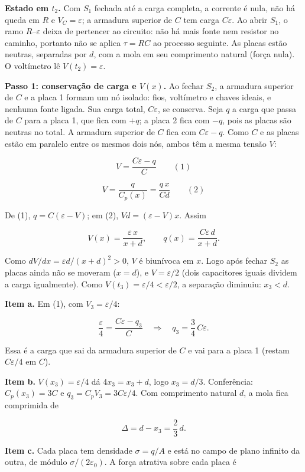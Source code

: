 \documentclass{article}%
\begin{document}
\textbf{Estado em $t_2$.} Com $S_1$ fechada até a carga completa, a corrente é nula, não há queda em $R$ e $V_C=\varepsilon$; a armadura superior de $C$ tem carga $C\varepsilon$. Ao abrir $S_1$, o ramo $R$–$\varepsilon$ deixa de pertencer ao circuito: não há mais fonte nem resistor no caminho, portanto não se aplica $\tau=RC$ ao processo seguinte. As placas estão neutras, separadas por $d$, com a mola em seu comprimento natural (força nula). O voltímetro lê $V(t_2)=\varepsilon$.

\textbf{Passo 1: conservação de carga e $V(x)$.} Ao fechar $S_2$, a armadura superior de $C$ e a placa 1 formam um nó isolado: fios, voltímetro e chaves ideais, e nenhuma fonte ligada. Sua carga total, $C\varepsilon$, se conserva. Seja $q$ a carga que passa de $C$ para a placa 1, que fica com $+q$; a placa 2 fica com $-q$, pois as placas são neutras no total. A armadura superior de $C$ fica com $C\varepsilon-q$. Como $C$ e as placas estão em paralelo entre os mesmos dois nós, ambos têm a mesma tensão $V$:

\[ V=\frac{C\varepsilon-q}{C}\qquad (1) \]

\[ V=\frac{q}{C_p(x)}=\frac{q\,x}{Cd}\qquad (2) \]

De (1), $q=C(\varepsilon-V)$; em (2), $Vd=(\varepsilon-V)x$. Assim

\[ V(x)=\frac{\varepsilon\,x}{x+d},\qquad q(x)=\frac{C\varepsilon\,d}{x+d}. \]

Como $dV/dx=\varepsilon d/(x+d)^2>0$, $V$ é biunívoca em $x$. Logo após fechar $S_2$ as placas ainda não se moveram ($x=d$), e $V=\varepsilon/2$ (dois capacitores iguais dividem a carga igualmente). Como $V(t_3)=\varepsilon/4<\varepsilon/2$, a separação diminuiu: $x_3<d$.

\textbf{Item a.} Em (1), com $V_3=\varepsilon/4$:

\[ \frac{\varepsilon}{4}=\frac{C\varepsilon-q_3}{C}\quad\Rightarrow\quad q_3=\frac{3}{4}\,C\varepsilon. \]

Essa é a carga que sai da armadura superior de $C$ e vai para a placa 1 (restam $C\varepsilon/4$ em $C$).

\textbf{Item b.} $V(x_3)=\varepsilon/4$ dá $4x_3=x_3+d$, logo $x_3=d/3$. Conferência: $C_p(x_3)=3C$ e $q_3=C_p V_3=3C\varepsilon/4$. Com comprimento natural $d$, a mola fica comprimida de

\[ \Delta=d-x_3=\frac{2}{3}\,d. \]

\textbf{Item c.} Cada placa tem densidade $\sigma=q/A$ e está no campo de plano infinito da outra, de módulo $\sigma/(2\varepsilon_0)$. A força atrativa sobre cada placa é
\end{document}
